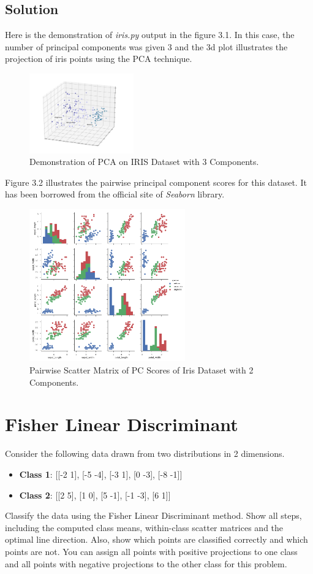 \documentclass[12pt]{article}
\numberwithin{equation}{section}
\numberwithin{table}{section}
\numberwithin{figure}{section}
\begin{document}
\subsection*{Solution}
Here is the demonstration of \textit{iris.py} output in the figure 3.1. In this case, the number of principal components was given 3 and the 3d plot illustrates the projection of iris points using the PCA technique.
		\begin{figure}[!h]\centering
	\includegraphics[width=0.4\textwidth]{4_1.PNG}
	\caption{Demonstration of PCA on IRIS Dataset with 3 Components.}
	\label{pl1}
\end{figure}
Figure 3.2 illustrates the pairwise principal component scores for this dataset. It has been borrowed from the official site of \textit{Seaborn} library.
		\begin{figure}[!h]\centering
	\includegraphics[width=0.6\textwidth]{4_2.PNG}
	\caption{Pairwise Scatter Matrix of PC Scores of Iris Dataset with 2 Components.}
	\label{pl1}
\end{figure}

\section{Fisher Linear Discriminant}
Consider the following data drawn from two distributions in 2 dimensions.
\begin{itemize}
	\item \textbf{Class 1}: [[-2 1], [-5 -4], [-3 1], [0 -3], [-8 -1]]
	\item \textbf{Class 2}: [[2 5], [1 0], [5 -1], [-1 -3], [6 1]]
\end{itemize}
Classify the data using the Fisher Linear Discriminant method. Show all steps, including the computed class means, within-class scatter matrices and the optimal line direction. Also, show which points are classified correctly and which points are not. You can assign all points with positive projections to one class and all points with negative projections to the other class for this problem.
\end{document}
